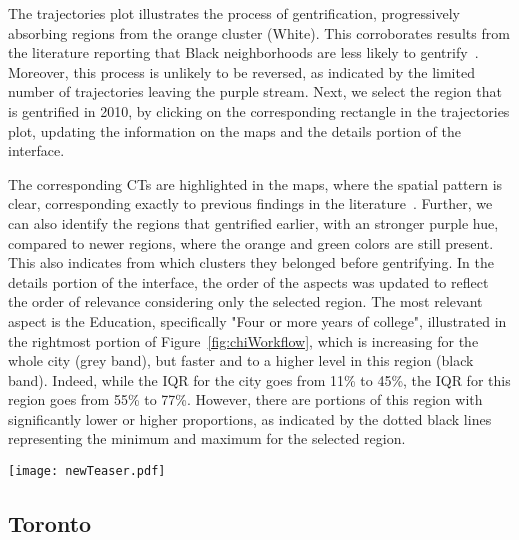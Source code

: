 The trajectories plot illustrates the process of gentrification, progressively
absorbing regions from the orange cluster (White). This corroborates results
from the literature reporting that Black neighborhoods are less likely to
gentrify~\cite{Hwang2014}. Moreover, this process is unlikely to be reversed, as
indicated by the limited number of trajectories leaving the purple stream. Next,
we select the region that is gentrified in 2010, by clicking on the
corresponding rectangle in the trajectories plot, updating the information on
the maps and the details portion of the interface.

The corresponding CTs are highlighted in the maps, where the spatial pattern is
clear, corresponding exactly to previous findings in the
literature~\cite{Hwang2014}. Further, we can also identify the regions that
gentrified earlier, with an stronger purple hue, compared to newer regions,
where the orange and green colors are still present. This also indicates from
which clusters they belonged before gentrifying. In the details portion of the
interface, the order of the aspects was updated to reflect the order of
relevance considering only the selected region. The most relevant aspect is the
Education, specifically "Four or more years of college", illustrated in the
rightmost portion of Figure~\ref{fig:chiWorkflow}, which is increasing for the
whole city (grey band), but faster and to a higher level in this region (black
band). Indeed, while the IQR for the city goes from 11\% to 45\%, the IQR for
this region goes from 55\% to 77\%. However, there are portions of this region
with significantly lower or higher proportions, as indicated by the dotted black
lines representing the minimum and maximum for the selected region.



\begin{figure*}
    \centering
 \texttt{[image: newTeaser.pdf]}
 \caption{Worflow to discover gentrification in Chicago: the purple cluster
 corresponds to high education / income. Its population is increasing over time,
 absorbing from the majority White cluster (orange). By selecting the purple
 cluster in 2010, the region is highlighted in the maps. The proportion of
 people with 4+ years of college is increasing in the whole city (grey IQRs),
 but significantly more in this region (black).\label{fig:chiWorkflow}}
\end{figure*}



\subsection{Toronto}

